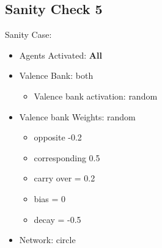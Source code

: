 \documentclass{article}\usepackage[]{graphicx}\usepackage[]{color}
\begin{document}
\subsection{Sanity Check 5}
\label{sec:sanity5}
Sanity Case:
\begin{itemize}
  \item Agents Activated: \textbf{All}
  \item Valence Bank: both
  \begin{itemize}
      \item Valence bank activation: random
  \end{itemize}
  \item Valence bank Weights: random
  \begin{itemize}
      \item opposite -0.2
      \item corresponding 0.5
      \item carry over = 0.2
      \item bias = 0
      \item decay = -0.5
  \end{itemize}
  \item Network: circle
\end{itemize}
%
%

\newpage
\end{document}
